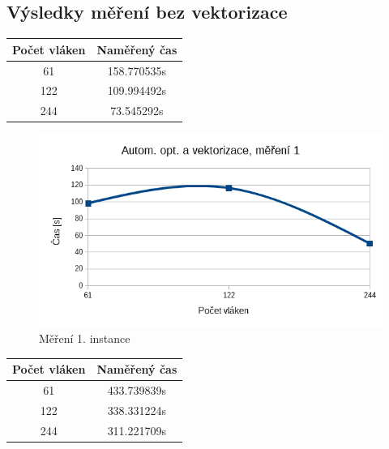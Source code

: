 \documentclass[12pt]{article}
\begin{document}
\subsection{Výsledky měření bez vektorizace}
%
%
\begin{center}
\begin{tabular}{ c | c }
\textbf{Počet vláken} & \textbf{Naměřený čas} \\ \hline \hline 
61 & 158.770535s \\ \hline
122 & 109.994492s \\ \hline
244 & 73.545292s \\ \hline
\end{tabular}
\end{center}

\begin{figure}[H]
  \begin{center}
      \includegraphics[width=12cm]{images/phi1.png}	
    \caption{Měření 1. instance} 
  \end{center}
\end{figure}
%
%
\begin{center}
\begin{tabular}{ c | c }
\textbf{Počet vláken} & \textbf{Naměřený čas} \\ \hline \hline 
61 & 433.739839s \\ \hline
122 & 338.331224s \\ \hline
244 & 311.221709s \\ \hline
\end{tabular}
\end{center}
\end{document}
